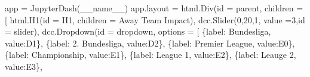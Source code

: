 \documentclass[
  letterpaper,
  DIV=11,
  numbers=noendperiod]{scrartcl}
\newenvironment{Shaded}{\begin{snugshade}}{\end{snugshade}}
\newcommand{\BuiltInTok}[1]{\textcolor[rgb]{0.00,0.23,0.31}{#1}}
\newcommand{\DecValTok}[1]{\textcolor[rgb]{0.68,0.00,0.00}{#1}}
\newcommand{\NormalTok}[1]{\textcolor[rgb]{0.00,0.23,0.31}{#1}}
\newcommand{\OperatorTok}[1]{\textcolor[rgb]{0.37,0.37,0.37}{#1}}
\newcommand{\StringTok}[1]{\textcolor[rgb]{0.13,0.47,0.30}{#1}}
\newcommand{\VariableTok}[1]{\textcolor[rgb]{0.07,0.07,0.07}{#1}}
\begin{document}
\begin{Shaded}
\begin{Highlighting}[]
\NormalTok{app }\OperatorTok{=}\NormalTok{ JupyterDash(}\VariableTok{\_\_name\_\_}\NormalTok{)}
\NormalTok{app.layout }\OperatorTok{=}\NormalTok{ html.Div(}\BuiltInTok{id} \OperatorTok{=} \StringTok{\textquotesingle{}parent\textquotesingle{}}\NormalTok{, children }\OperatorTok{=}\NormalTok{ [}
\NormalTok{    html.H1(}\BuiltInTok{id} \OperatorTok{=} \StringTok{\textquotesingle{}H1\textquotesingle{}}\NormalTok{, children }\OperatorTok{=} \StringTok{\textquotesingle{}Away Team Impact\textquotesingle{}}\NormalTok{),}
\NormalTok{    dcc.Slider(}\DecValTok{0}\NormalTok{,}\DecValTok{20}\NormalTok{,}\DecValTok{1}\NormalTok{, value }\OperatorTok{=}\DecValTok{3}\NormalTok{,}\BuiltInTok{id} \OperatorTok{=} \StringTok{\textquotesingle{}slider\textquotesingle{}}\NormalTok{),}
\NormalTok{    dcc.Dropdown(}\BuiltInTok{id} \OperatorTok{=} \StringTok{\textquotesingle{}dropdown\textquotesingle{}}\NormalTok{, }
\NormalTok{                 options }\OperatorTok{=}\NormalTok{ [}
\NormalTok{                \{}\StringTok{\textquotesingle{}label\textquotesingle{}}\NormalTok{: }\StringTok{\textquotesingle{}Bundesliga\textquotesingle{}}\NormalTok{, }\StringTok{\textquotesingle{}value\textquotesingle{}}\NormalTok{:}\StringTok{\textquotesingle{}D1\textquotesingle{}}\NormalTok{\},}
\NormalTok{                \{}\StringTok{\textquotesingle{}label\textquotesingle{}}\NormalTok{: }\StringTok{\textquotesingle{}2. Bundesliga\textquotesingle{}}\NormalTok{, }\StringTok{\textquotesingle{}value\textquotesingle{}}\NormalTok{:}\StringTok{\textquotesingle{}D2\textquotesingle{}}\NormalTok{\},}
\NormalTok{                \{}\StringTok{\textquotesingle{}label\textquotesingle{}}\NormalTok{: }\StringTok{\textquotesingle{}Premier League\textquotesingle{}}\NormalTok{, }\StringTok{\textquotesingle{}value\textquotesingle{}}\NormalTok{:}\StringTok{\textquotesingle{}E0\textquotesingle{}}\NormalTok{\},}
\NormalTok{                \{}\StringTok{\textquotesingle{}label\textquotesingle{}}\NormalTok{: }\StringTok{\textquotesingle{}Championship\textquotesingle{}}\NormalTok{, }\StringTok{\textquotesingle{}value\textquotesingle{}}\NormalTok{:}\StringTok{\textquotesingle{}E1\textquotesingle{}}\NormalTok{\},}
\NormalTok{                \{}\StringTok{\textquotesingle{}label\textquotesingle{}}\NormalTok{: }\StringTok{\textquotesingle{}League 1\textquotesingle{}}\NormalTok{, }\StringTok{\textquotesingle{}value\textquotesingle{}}\NormalTok{:}\StringTok{\textquotesingle{}E2\textquotesingle{}}\NormalTok{\},}
\NormalTok{                \{}\StringTok{\textquotesingle{}label\textquotesingle{}}\NormalTok{: }\StringTok{\textquotesingle{}Leauge 2\textquotesingle{}}\NormalTok{, }\StringTok{\textquotesingle{}value\textquotesingle{}}\NormalTok{:}\StringTok{\textquotesingle{}E3\textquotesingle{}}\NormalTok{\},}

\end{Highlighting}
\end{Shaded}
\end{document}
